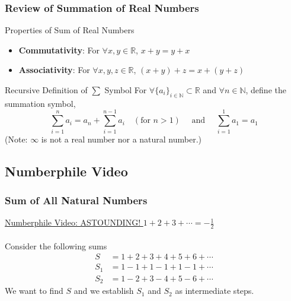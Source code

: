 \documentclass{beamer}
\begin{document}

\begin{frame}
\frametitle{Review of Summation of Real Numbers}

\begin{block}{Properties of Sum of Real Numbers}
\begin{itemize}
    \item \textbf{Commutativity}: For $ \forall x, y \in \mathbb{R} $, $x + y = y + x $
    \item \textbf{Associativity}: For $ \forall x, y, z \in \mathbb{R} $, $ (x + y) + z = x + (y + z) $ 
\end{itemize}
\end{block}

\begin{block}{Recursive Definition of $ \sum $ Symbol}
For $ \forall \{a_i\}_{i \in \mathbb{N}} \subset \mathbb{R} $ and $ \forall n \in \mathbb{N} $, define the summation symbol, 
$$ \sum_{i=1}^{n} a_i = a_n + \sum_{i=1}^{n-1} a_i 
\quad (\text{for } n > 1) \quad \text{ and } \quad 
\sum_{i=1}^{1} a_1 = a_1 $$
(Note: $ \infty $ is not a real number nor a natural number.)
\end{block}

\end{frame}


\subsection{Numberphile Video}

\begin{frame}
\frametitle{Sum of All Natural Numbers}

\href{https://www.youtube.com/watch?v=w-I6XTVZXww}{Numberphile Video: ASTOUNDING! $ 1 + 2 + 3 + \cdots = -\frac{1}{2} $} \\ 
\ \\
Consider the following sums
\begin{align*}
    S   &= 1 + 2 + 3 + 4 + 5 + 6 + \cdots \\ 
    S_1 &= 1 - 1 + 1 - 1 + 1 - 1 + \cdots \\ 
    S_2 &= 1 - 2 + 3 - 4 + 5 - 6 + \cdots
\end{align*}
We want to find $S$ and we establish $S_1$ and $S_2$ as intermediate steps. 

\end{frame}
\end{document}

